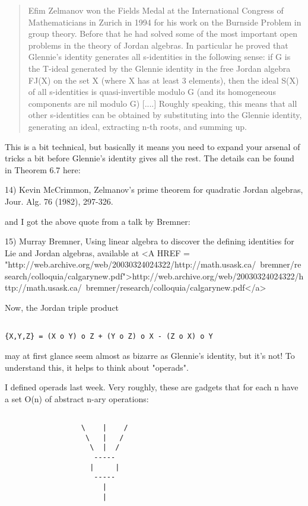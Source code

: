 \begin{quote}
   Efim Zelmanov won the Fields Medal at the International Congress of
   Mathematicians in Zurich in 1994 for his work on the Burnside Problem
   in group theory. Before that he had solved some of the most important
   open problems in the theory of Jordan algebras.  In particular he
   proved that Glennie's identity generates all s-identities in the
   following sense: if G is the T-ideal generated by the Glennie
   identity in the free Jordan algebra FJ(X) on the set X (where X has
   at least 3 elements), then the ideal S(X) of all s-identities is
   quasi-invertible modulo G (and its homogeneous components are nil
   modulo G) [....] Roughly speaking, this means that all other
   s-identities can be obtained by substituting into the Glennie
   identity, generating an ideal, extracting n-th roots, and summing up.

\end{quote}
This is a bit technical, but basically it means you need to expand your
arsenal of tricks a bit before Glennie's identity gives all the rest.
The details can be found in Theorem 6.7 here:

14) Kevin McCrimmon, Zelmanov's prime theorem for quadratic Jordan 
algebras, Jour. Alg. 76 (1982), 297-326. 

and I got the above quote from a talk by Bremner:

15) Murray Bremner, Using linear algebra to discover the defining
identities for Lie and Jordan algebras, available at 
<A HREF = "http://web.archive.org/web/20030324024322/http://math.usask.ca/~bremner/research/colloquia/calgarynew.pdf">http://web.archive.org/web/20030324024322/http://math.usask.ca/~bremner/research/colloquia/calgarynew.pdf</a>

Now, the Jordan triple product


\begin{verbatim}

{X,Y,Z} = (X o Y) o Z + (Y o Z) o X - (Z o X) o Y
\end{verbatim}
    
may at first glance seem almost as bizarre as Glennie's identity,
but it's not!  To understand this, it helps to think about "operads".

I defined operads last week.  Very roughly, these are gadgets 
that for each n have a set O(n) of abstract n-ary operations:



\begin{verbatim}

                  \    |    /
                   \   |   / 
                    \  |  /
                     -----
                    |     | 
                     -----
                       |
                       |
\end{verbatim}
    
